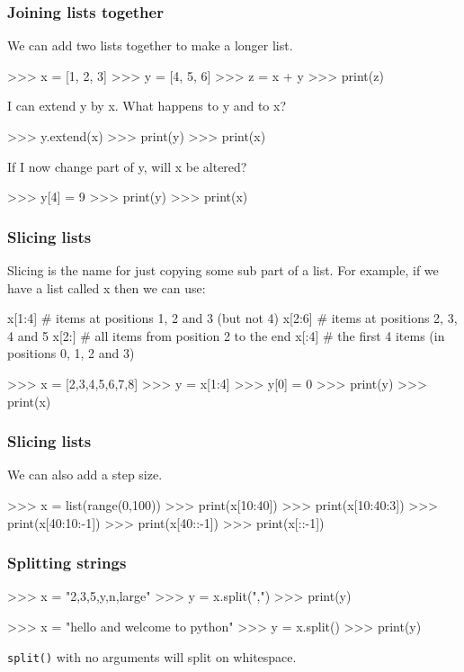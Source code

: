 \documentclass{beamer}
\begin{document}
\begin{frame}[fragile]
\frametitle{Joining lists together}
We can add two lists together to make a longer list.
\begin{code}
>>> x = [1, 2, 3]
>>> y = [4, 5, 6]
>>> z = x + y
>>> print(z)
\end{code}
 I can extend y by x. What happens to y and to x?
\begin{code}
>>> y.extend(x)
>>> print(y)
>>> print(x)
\end{code}
 If I now change part of y, will x be altered?
\begin{code}
>>> y[4] = 9
>>> print(y)
>>> print(x)
\end{code}
\end{frame}

\begin{frame}[fragile]
\frametitle{Slicing lists}
Slicing is the name for just copying some sub part of a list.
For example, if we have a list called x then we can use:
\begin{code}
x[1:4] # items at positions 1, 2 and 3 (but not 4)
x[2:6] # items at positions 2, 3, 4 and 5
x[2:] # all items from position 2 to the end 
x[:4] # the first 4 items (in positions 0, 1, 2 and 3)
\end{code}

\begin{code}
>>> x = [2,3,4,5,6,7,8]
>>> y = x[1:4]
>>> y[0] = 0
>>> print(y)
>>> print(x)
\end{code}
\end{frame}

\begin{frame}[fragile]
\frametitle{Slicing lists}
We can also add a step size.
\begin{code}
>>> x = list(range(0,100))
>>> print(x[10:40])
>>> print(x[10:40:3])
>>> print(x[40:10:-1])
>>> print(x[40::-1])
>>> print(x[::-1])
\end{code}
\end{frame}

\begin{frame}[fragile]
\frametitle{Splitting strings}
\begin{code}
>>> x = "2,3,5,y,n,large"
>>> y = x.split(",")
>>> print(y)

>>> x = "hello and welcome to python"
>>> y = x.split()
>>> print(y)
\end{code}

\texttt{split()} with no arguments will split on whitespace.
\end{frame}
\end{document}
